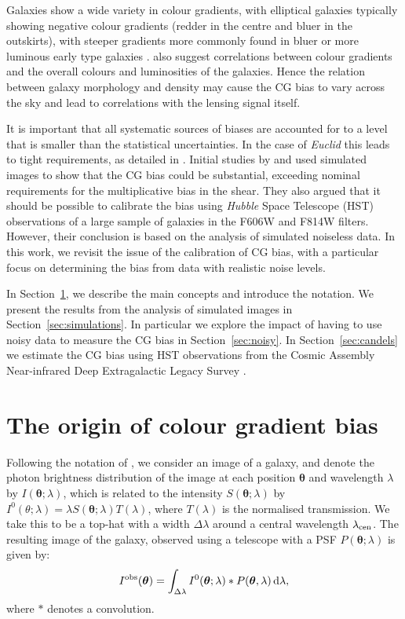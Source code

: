 \documentclass[useAMS,usenatbib]{mnras}
\renewcommand{\d}{\mathrm{d}}
\newcommand{\be}{\begin{equation}}
\newcommand{\ee}{\end{equation}}
\begin{document}
Galaxies show a wide variety in colour gradients, with elliptical galaxies typically showing negative colour gradients (redder in the centre and bluer in the outskirts), with steeper gradients more commonly found in bluer or more luminous early type galaxies \citep[e.g.][]{2011MNRAS.414.3052D,
2011MNRAS.411.1151G}. \citet[][]{2010AJ....140.1528L, 2016A&A...593A..84K} also suggest
correlations between colour gradients and the overall colours and luminosities of the galaxies.
Hence the relation between galaxy morphology and density may cause the CG bias to vary across the sky and lead to correlations with the lensing signal itself. 

It is important that all systematic sources of biases are accounted for to a level that is smaller than the 
statistical uncertainties. In the case of {\it Euclid} this leads to tight requirements, as detailed in 
\citep[e.g.][]{Massey13,Cropper13}. Initial studies by \cite{Voigt12} and  used simulated images to show that the CG bias could be substantial,
exceeding nominal requirements for the multiplicative bias in the shear. They also argued
that it should be possible to calibrate the bias using {\it Hubble} Space Telescope (HST) observations
of a large sample of galaxies in the F606W and F814W filters. However, their conclusion is based on the analysis of simulated noiseless data. In this work, we revisit the issue of the calibration of CG bias,
with a particular focus on determining the bias from data with realistic noise levels. 

In Section~\ref{sec:concepts}, we describe the main concepts and introduce the notation. We present the results from the analysis of simulated images in Section~\ref{sec:simulations}. In particular we explore the  impact of having to use noisy data to measure the CG bias in Section~\ref{sec:noisy}.
In Section~\ref{sec:candels} we estimate the CG bias using HST observations from the Cosmic Assembly Near-infrared Deep Extragalactic Legacy Survey \citep[CANDELS;][]{candelsref}.

\section{The origin of colour gradient bias}
\label{sec:concepts}

Following the notation of , we consider an image of a galaxy, and denote the photon brightness
distribution of the image at each position $\bm \theta$ and wavelength $\lambda$ by $I({\bm \theta};\lambda)$, which is related to the intensity $S({\bm\theta};\lambda)$ by $I^0(\theta;\lambda)=\lambda S({\bm\theta};\lambda)
T(\lambda)$, where $T(\lambda)$ is the normalised transmission. We take this to be a top-hat with a
width $\Delta\lambda$ around a central wavelength $\lambda_{\rm cen}$. The resulting image of the galaxy, observed using a telescope with a PSF $P({\bm \theta};\lambda)$  is given by:
%
\be
I^{\rm obs}({\bm\theta}) = \int_{\Delta\lambda} I^0({\bm\theta}; \lambda) *  
P({\bm \theta},\lambda)\, \d \lambda,
\label{eq:iobs}
\ee
%
where $*$ denotes a convolution. 
\end{document}
